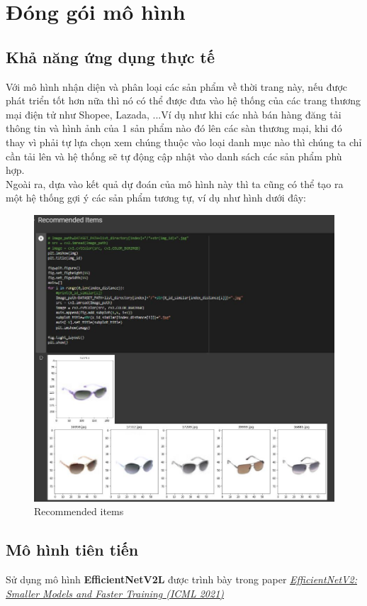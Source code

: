 \section{Đóng gói mô hình}
\subsection{Khả năng ứng dụng thực tế}
Với mô hình nhận diện và phân loại các sản phẩm về thời trang này, nếu được phát triển tốt hơn nữa thì nó có thể được đưa vào hệ thống của các trang thương mại điện tử như Shopee, Lazada, ...Ví dụ như khi các nhà bán hàng đăng tải thông tin và hình ảnh của 1 sản phẩm nào đó lên các sàn thương mại, khi đó thay vì phải tự lựa chọn xem chúng thuộc vào loại danh mục nào thì chúng ta chỉ cần tải lên và hệ thống sẽ tự động cập nhật vào danh sách các sản phẩm phù hợp.\\

Ngoài ra, dựa vào kết quả dự đoán của mô hình này thì ta cũng có thể tạo ra một hệ thống gợi ý các sản phẩm tương tự, ví dụ như hình dưới đây:
\begin{center}
    \begin{figure}[!h]
        \centering
        \includegraphics[scale = 0.8]{fileanh/41.jpg}
        \caption{Recommended items}
    \end{figure}
\end{center}


\subsection{Mô hình tiên tiến}
Sử dụng mô hình \textbf{EfficientNetV2L} được trình bày trong paper \href{https://arxiv.org/abs/2104.00298}{\textit{EfficientNetV2: Smaller Models and Faster Training (ICML 2021)}}